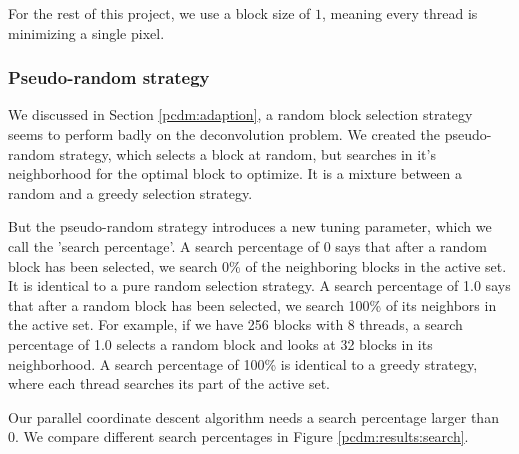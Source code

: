 For the rest of this project, we use a block size of $1$, meaning every thread is minimizing a single pixel.


\subsubsection{Pseudo-random strategy}
We discussed in Section \ref{pcdm:adaption}, a random block selection strategy seems to perform badly on the deconvolution problem. We created the pseudo-random strategy, which selects a block at random, but searches in it's neighborhood for the optimal block to optimize. It is a mixture between a random and a greedy selection strategy.

But the pseudo-random strategy introduces a new tuning parameter, which we call the 'search percentage'. A search percentage of 0 says that after a random block has been selected, we search 0\% of the neighboring blocks in the active set. It is identical to a pure random selection strategy. A search percentage of 1.0 says that after a random block has been selected, we search 100\% of its neighbors in the active set. For example, if we have 256 blocks with 8 threads, a search percentage of 1.0 selects a random block and looks at 32 blocks in its neighborhood. A search percentage of 100\% is identical to a greedy strategy, where each thread searches its part of the active set.

Our parallel coordinate descent algorithm needs a search percentage larger than 0. We compare different search percentages in Figure \ref{pcdm:results:search}.

